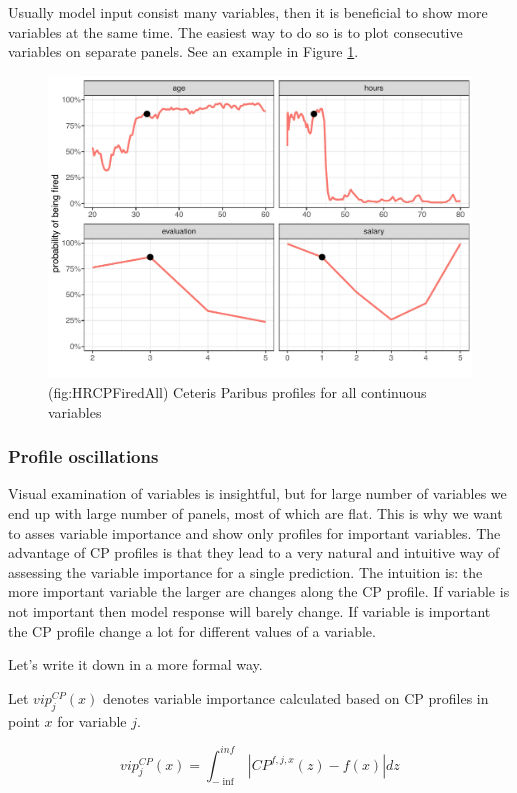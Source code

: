 \documentclass[]{krantz}
\theoremstyle{definition}
\theoremstyle{definition}
\theoremstyle{definition}
\theoremstyle{remark}
\begin{document}
Usually model input consist many variables, then it is beneficial to
show more variables at the same time. The easiest way to do so is to
plot consecutive variables on separate panels. See an example in Figure
\ref{fig:HRCPFiredAll}.

\begin{figure}

{\centering \includegraphics[width=0.7\linewidth]{figure/HR_cp_fired_all} 

}

\caption{(fig:HRCPFiredAll) Ceteris Paribus profiles for all continuous variables}\label{fig:HRCPFiredAll}
\end{figure}

\hypertarget{oscillations}{%
\subsubsection{Profile oscillations}\label{oscillations}}

Visual examination of variables is insightful, but for large number of
variables we end up with large number of panels, most of which are flat.
This is why we want to asses variable importance and show only profiles
for important variables. The advantage of CP profiles is that they lead
to a very natural and intuitive way of assessing the variable importance
for a single prediction. The intuition is: the more important variable
the larger are changes along the CP profile. If variable is not
important then model response will barely change. If variable is
important the CP profile change a lot for different values of a
variable.

Let's write it down in a more formal way.

Let \(vip^{CP}_j(x)\) denotes variable importance calculated based on CP
profiles in point \(x\) for variable \(j\).

\[
vip^{CP}_j(x) = \int_{-\inf}^{inf} |CP^{f,j,x}(z) - f(x)| dz
\]
\end{document}
